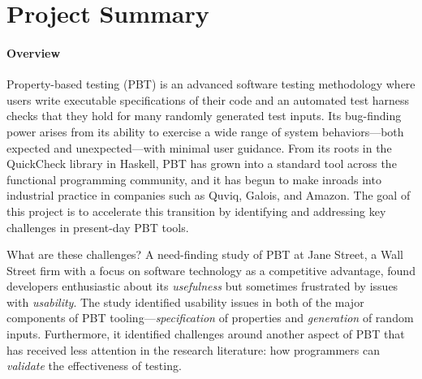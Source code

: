 \section*{Project Summary}

\paragraph*{Overview}
Property-based testing (PBT) is an advanced software testing
methodology where users write executable specifications of their code
and an automated test harness checks that they hold for many randomly
generated test inputs.  Its bug-finding power arises from its ability
to exercise a wide range of system behaviors---both expected and
unexpected---with minimal user guidance.
%
From its roots in the QuickCheck library in Haskell, PBT has grown
into a standard tool across the functional programming community, and it
has begun to make inroads into industrial practice
in companies such as Quviq, Galois, and Amazon.\iflater{}\fi{}
%
The goal of this project is to accelerate this transition
by identifying and addressing key challenges in
present-day PBT tools.

What are these challenges?
A need-finding study of PBT at Jane
Street, a Wall Street firm with a focus on software
technology as a competitive advantage, found developers enthusiastic
about its {\em usefulness} but
sometimes frustrated by issues with {\em usability}.
%
The study identified usability issues in both of the major components
of PBT tooling---{\em specification} of properties and {\em
  generation} of random inputs. Furthermore, it identified challenges
around another aspect of PBT that has received less attention in the
research literature: how programmers can {\em validate} the
effectiveness of testing.


